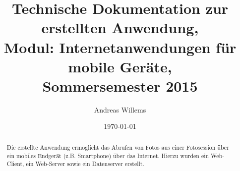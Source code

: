 \documentclass[a4paper]{scrartcl}
\title{Technische Dokumentation zur erstellten Anwendung,\\
	Modul: Internetanwendungen für mobile Geräte,\\Sommersemester 2015}
\author{Andreas Willems}
\date{\today}
\begin{document}

\maketitle

\begin{abstract}
Die erstellte Anwendung ermöglicht das Abrufen von Fotos aus einer Fotosession über ein mobiles Endgerät (z.B. Smartphone) über das Internet. Hierzu wurden ein Web-Client, ein Web-Server sowie ein Datenserver erstellt.
\end{abstract}
\tableofcontents
\newpage





\end{document}
